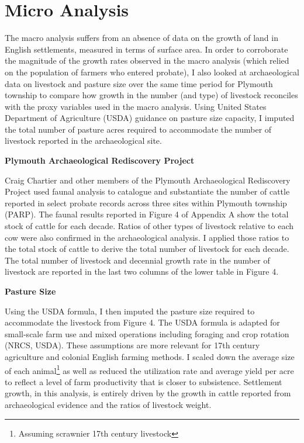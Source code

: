 \documentclass[11pt]{article}
\begin{document}
\section{Micro Analysis}
The macro analysis suffers from an absence of data on the growth of land in English settlements, measured in terms of surface area. In order to corroborate the magnitude of the growth rates observed in the macro analysis (which relied on the population of farmers who entered probate), I also looked at archaeological data on livestock and pasture size over the same time period for Plymouth township to compare how growth in the number (and type) of livestock reconciles with the proxy variables used in the macro analysis. Using United States Department of Agriculture (USDA) guidance on pasture size capacity, I imputed the total number of pasture acres required to accommodate the number of livestock reported in the archaeological site.

\noindent\textbf{Plymouth Archaeological Rediscovery Project}

Craig Chartier and other members of the Plymouth Archaeological Rediscovery Project used faunal analysis to catalogue and substantiate the number of cattle reported in select probate records across three sites within Plymouth township (PARP). The faunal results reported in Figure 4 of Appendix A show the total stock of cattle for each decade. Ratios of other types of livestock relative to each cow were also confirmed in the archaeological analysis. I applied those ratios to the total stock of cattle to derive the total number of livestock for each decade. The total number of livestock and decennial growth rate in the number of livestock are reported in the last two columns of the lower table in Figure 4.

\noindent\textbf{Pasture Size}

Using the USDA formula, I then imputed the pasture size required to accommodate the livestock from Figure 4. The USDA formula is adapted for small-scale farm use and mixed operations including foraging and crop rotation (NRCS, USDA). These assumptions are more relevant for 17th century agriculture and colonial English farming methods. I scaled down the average size of each animal\footnote{Assuming scrawnier 17th century livestock} as well as reduced the utilization rate and average yield per acre to reflect a level of farm productivity that is closer to subsistence. Settlement growth, in this analysis, is entirely driven by the growth in cattle reported from archaeological evidence and the ratios of livestock weight.
\end{document}
